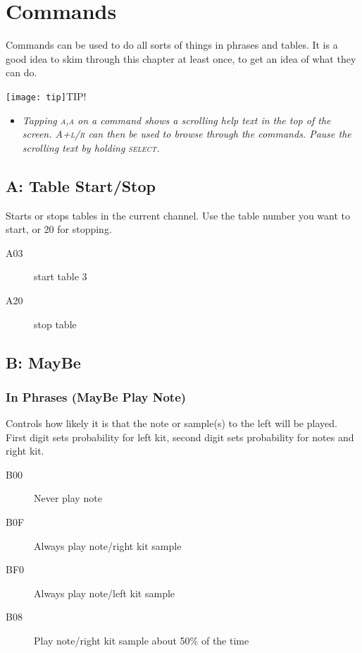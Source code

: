 \chapter{Commands}

Commands can be used to do all sorts of things in phrases and tables. It is a good idea to skim through this chapter at least once, to get an idea of what they can do.

\texttt{[image: tip]}TIP!
\begin{itemize}
        \item \textit{Tapping \textsc{a,a} on a command shows a scrolling help text in the top of the screen. \textsc{A+l/r} can then be used to browse through the commands. Pause the scrolling text by holding \textsc{select}.}
\end{itemize}

\section{A: Table Start/Stop}

Starts or stops tables in the current channel. Use the table number you want to start, or 20 for stopping.

\begin{description}
\item[A03] start table 3
\item[A20] stop table
\end{description}

\section{B: MayBe}

\subsection{In Phrases (MayBe Play Note)}

Controls how likely it is that the note
or sample(s) to the left will be played.
First digit sets probability for left kit,
second digit sets probability for notes
and right kit.

\begin{description}
    \item[B00] Never play note
    \item[B0F] Always play note/right kit sample
    \item[BF0] Always play note/left kit sample
    \item[B08] Play note/right kit sample about 50\% of the time
\end{description}

